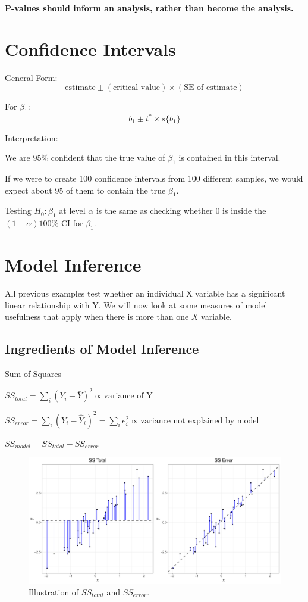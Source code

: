 \documentclass[12pt]{../notes}
\begin{document}
\nspace
\textbf{P-values should inform an analysis, rather than become the analysis.}

\section*{Confidence Intervals}

\bi
\item General Form:
\[
\text{estimate} \pm (\text{critical value})\times(\text{SE of estimate})
\]
\item For $\beta_1$:
\[b_1 \pm t^*\times s\{b_1\}\]
\item Interpretation:
\bi
\item We are 95\% confident that the true value of $\beta_1$ is contained in this interval. 
\item If we were to create 100 confidence intervals from 100 different samples, we would expect about 95 of them to contain the true $\beta_1.$
\ei
\ei

\nspace
Testing $H_0: \beta_1$ at level $\alpha$ is the same as checking whether 0 is inside the $(1-\alpha)100\%$ CI for $\beta_1$. 

\section*{Model Inference}
All previous examples test whether an individual X variable has a significant linear relationship with Y. We will now look at some measures of model usefulness that apply when there is more than one $X$ variable. 

\subsection*{Ingredients of Model Inference}
\bi
\item Sum of Squares
\bi
\item $SS_{total} = \sum_i\left(Y_i - \bar{Y}\right)^2 \propto \text{variance of Y}$
\item $SS_{error} = \sum_i\left(Y_i - \hat{Y}_i\right)^2 = \sum_ie_i^2 \propto \text{variance not explained by model}$
\item $SS_{model} = SS_{total} - SS_{error}$
\ei
\ei

\begin{figure}[H]
\includegraphics[width=\textwidth]{../figures/module2/ssError.pdf}
\caption{Illustration of $SS_{total}$ and $SS_{error}$.}
\end{figure}
\end{document}
